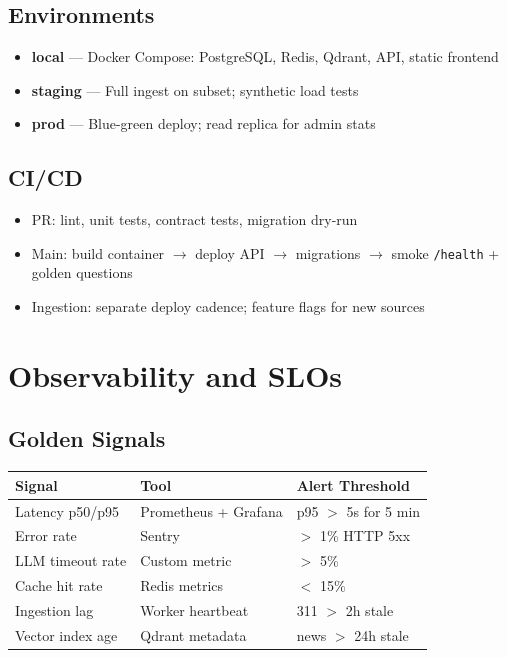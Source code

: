 \documentclass[11pt,a4paper]{article}
\begin{document}
\subsection{Environments}
\begin{itemize}[noitemsep]
  \item \textbf{local} --- Docker Compose: PostgreSQL, Redis, Qdrant, API, static frontend
  \item \textbf{staging} --- Full ingest on subset; synthetic load tests
  \item \textbf{prod} --- Blue-green deploy; read replica for admin stats
\end{itemize}

\subsection{CI/CD}
\begin{itemize}[noitemsep]
  \item PR: lint, unit tests, contract tests, migration dry-run
  \item Main: build container $\rightarrow$ deploy API $\rightarrow$ migrations $\rightarrow$ smoke \texttt{/health} + golden questions
  \item Ingestion: separate deploy cadence; feature flags for new sources
\end{itemize}

\section{Observability and SLOs}

\subsection{Golden Signals}
\begin{table}[h]
\centering
\small
\begin{tabular}{@{}lll@{}}
\toprule
\textbf{Signal} & \textbf{Tool} & \textbf{Alert Threshold} \\
\midrule
Latency p50/p95 & Prometheus + Grafana & p95 $>$ 5s for 5 min \\
Error rate & Sentry & $>$ 1\% HTTP 5xx \\
LLM timeout rate & Custom metric & $>$ 5\% \\
Cache hit rate & Redis metrics & $<$ 15\% \\
Ingestion lag & Worker heartbeat & 311 $>$ 2h stale \\
Vector index age & Qdrant metadata & news $>$ 24h stale \\
\bottomrule
\end{tabular}
\end{table}
\end{document}
